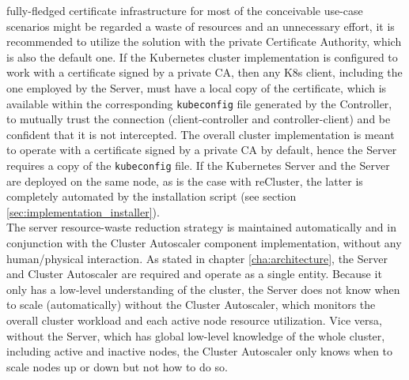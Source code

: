 fully-fledged certificate infrastructure for most of the conceivable use-case
scenarios might be regarded a waste of resources and an unnecessary effort, it is
recommended to utilize the solution with the private Certificate Authority,
which is also the default one. If the Kubernetes cluster implementation is configured
to work with a certificate signed by a private CA, then any K8s client, including
the one employed by the Server, must have a local copy of the certificate, which
is available within the corresponding \texttt{kubeconfig} file generated by the
Controller, to mutually trust the connection (client-controller and controller-client)
and be confident that it is not intercepted. The overall cluster implementation
is meant to operate with a certificate signed by a private CA by default, hence the
Server requires a copy of the \texttt{kubeconfig} file. If the Kubernetes Server
and the Server are deployed on the same node, as is the case with reCluster, the
latter is completely automated by the installation script (see section
\ref{sec:implementation_installer}). \\ %
The server resource-waste reduction strategy is maintained automatically and in conjunction
with the Cluster Autoscaler component implementation, without any human/physical
interaction. As stated in chapter \ref{cha:architecture}, the Server and Cluster
Autoscaler are required and operate as a single entity. Because it only has a low-level
understanding of the cluster, the Server does not know when to scale (automatically)
without the Cluster Autoscaler, which monitors the overall cluster workload and each
active node resource utilization. Vice versa, without the Server, which has
global low-level knowledge of the whole cluster, including active and inactive nodes,
the Cluster Autoscaler only knows when to scale nodes up or down but not how to
do so.

